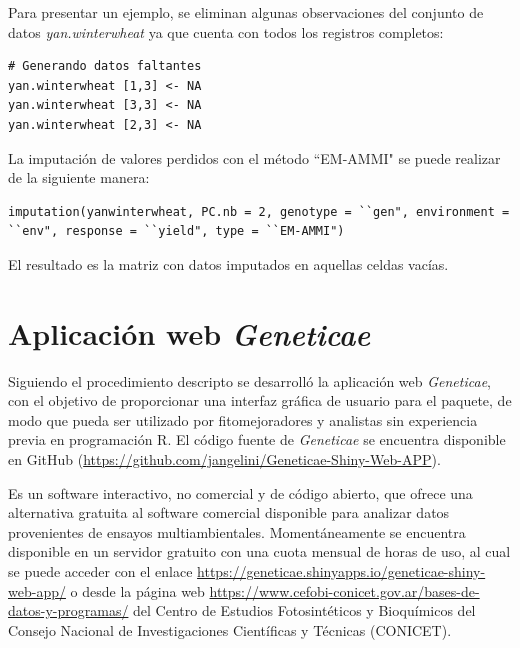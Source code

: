 Para presentar un ejemplo, se eliminan algunas observaciones del conjunto de datos \emph{yan.winterwheat} ya que cuenta con todos los registros completos:

\begin{tcolorbox}[skin=bicolor,
    colframe=aurometalsaurus,colback=backcolour,colbacklower=white,
    width=1\linewidth,
    height=0.15\linewidth,
    boxsep=-3mm]
\begin{lstlisting}
# Generando datos faltantes
yan.winterwheat [1,3] <- NA
yan.winterwheat [3,3] <- NA
yan.winterwheat [2,3] <- NA
\end{lstlisting}
\end{tcolorbox}

La imputación de valores perdidos con el método ``EM-AMMI" se puede realizar de la siguiente manera:

\begin{tcolorbox}[skin=bicolor,
    colframe=aurometalsaurus,colback=backcolour,colbacklower=white,
    width=1\linewidth,
    height=0.08\linewidth,
    boxsep=-3mm]
\begin{lstlisting}
imputation(yanwinterwheat, PC.nb = 2, genotype = ``gen", environment = ``env", response = ``yield", type = ``EM-AMMI")
\end{lstlisting}
\end{tcolorbox}

El resultado es la matriz con datos imputados en aquellas celdas vacías. 

\section{Aplicación web \emph{Geneticae}}

Siguiendo el procedimiento descripto se desarrolló la aplicación web \emph{Geneticae}, con el objetivo de proporcionar una interfaz gráfica de usuario para el paquete, de modo que pueda ser utilizado por fitomejoradores y analistas sin experiencia previa en programación R. El código fuente de \emph{Geneticae} se encuentra disponible en GitHub (\url{https://github.com/jangelini/Geneticae-Shiny-Web-APP}). 

Es un software interactivo, no comercial y de código abierto, que ofrece una alternativa gratuita al software comercial disponible para analizar datos provenientes de ensayos multiambientales. Momentáneamente se encuentra disponible en un servidor gratuito con una cuota mensual de horas de uso, al cual se puede acceder con el enlace \url{https://geneticae.shinyapps.io/geneticae-shiny-web-app/} o desde la página web \url{https://www.cefobi-conicet.gov.ar/bases-de-datos-y-programas/} del Centro de Estudios Fotosintéticos y Bioquímicos del Consejo Nacional de Investigaciones Científicas y Técnicas (CONICET).

